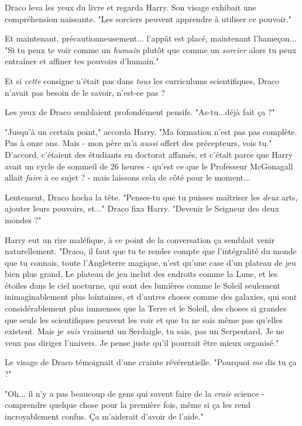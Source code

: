 Draco leva les yeux du livre et regarda Harry. Son visage exhibait une compréhension naissante. "Les sorciers peuvent apprendre à utiliser ce pouvoir."

Et maintenant, précautionneusement... l'appât est placé, maintenant l'hameçon... "Si tu peux te voir comme un \emph{humain}  plutôt que comme un \emph{sorcier}  alors tu peux entraîner et affiner tes pouvoirs d'humain."

Et si \emph{cette}  consigne n'était pas dans \emph{tous}  les curriculums scientifiques, Draco n'avait pas besoin de le savoir, n'est-ce pas ?

Les yeux de Draco semblaient profondément pensifs. "As-tu...déjà fait ça ?"

"Jusqu'à un certain point," accorda Harry. "Ma formation n'est pas pas complète. Pas à onze ans. Mais - mon père m'a \emph{aussi}  offert des précepteurs, vois tu." D'accord, c'étaient des étudiants en doctorat affamés, et c'était parce que Harry avait un cycle de sommeil de 26 heures - qu'est ce que le Professeur McGonagall allait \emph{faire}  à ce sujet ? - mais laissons cela de côté pour le moment...

Lentement, Draco hocha la tête. "Penses-tu que tu puisses maîtriser les \emph{deux}  arts, ajouter leurs pouvoirs, et..." Draco fixa Harry. "Devenir le Seigneur des deux mondes ?"

Harry eut un rire maléfique, à ce point de la conversation ça semblait venir naturellement. "Draco, il faut que tu te rendes compte que l'intégralité du monde que tu connais, toute l'Angleterre magique, n'est qu'une case d'un plateau de jeu bien plus grand. Le plateau de jeu inclut des endroits comme la Lune, et les étoiles dans le ciel nocturne, qui sont des lumières comme le Soleil seulement inimaginablement plus lointaines, et d'autres choses comme des galaxies, qui sont considérablement plus immenses que la Terre et le Soleil, des choses si grandes que seuls les scientifiques peuvent les voir et que tu ne sais même pas qu'elles existent. Mais je \emph{suis}  vraiment un Serdaigle, tu sais, pas un Serpentard. Je ne veux pas diriger l'univers. Je pense juste qu'il pourrait être mieux organisé."

Le visage de Draco témoignait d'une crainte révérentielle. "Pourquoi \emph{me}  dis tu ça ?"

"Oh... il n'y a pas beaucoup de gens qui savent faire de la \emph{vraie}  science - comprendre quelque chose pour la première fois, même si ça les rend incroyablement confus. Ça m'aiderait d'avoir de l'aide."

